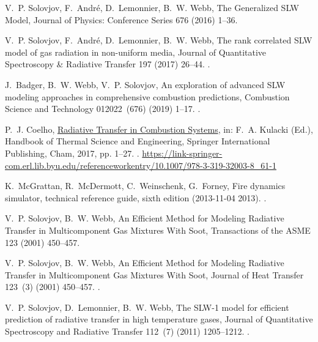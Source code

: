 \documentclass[preprint,12pt]{elsarticle}
\begin{document}
\begin{thebibliography}{10}
V.~P. Solovjov, F.~Andr{\'e}, D.~Lemonnier, B.~W. Webb, {The Generalized {SLW}
Model}, {Journal of Physics: Conference Series} 676 (2016) 1--36.

V.~P. Solovjov, F.~Andr{\'e}, D.~Lemonnier, B.~W. Webb, {The rank correlated
{SLW} model of gas radiation in non-uniform media}, {Journal of Quantitative
Spectroscopy {\&} Radiative Transfer} 197 (2017) 26--44.
\newblock \href {http://dx.doi.org/10.1016/j.jqsrt.2017.01.034}
  {}.

J.~Badger, B.~W. Webb, V.~P. Solovjov, {An exploration of advanced {SLW}
modeling approaches in comprehensive combustion predictions}, {Combustion
Science and Technology} 012022~(676) (2019) 1--17.
\newblock \href {http://dx.doi.org/10.1080/00102202.2019.1678907}
  {}.

P.~J. Coelho,
\href{https://link-springer-com.erl.lib.byu.edu/referenceworkentry/10.1007/978-3-319-32003-8_61-1}{{Radiative
Transfer in Combustion Systems}}, in: F.~A. Kulacki (Ed.), {Handbook of
Thermal Science and Engineering}, {Springer International Publishing}, Cham,
2017, pp. 1--27.
\newblock \href {http://dx.doi.org/10.1007/978-3-319-32003-8{\textunderscore
  }61-1} {}.
\newline\urlprefix\url{https://link-springer-com.erl.lib.byu.edu/referenceworkentry/10.1007/978-3-319-32003-8_61-1}

K.~McGrattan, R.~McDermott, C.~Weinschenk, G.~Forney, Fire dynamics simulator,
technical reference guide, sixth edition (2013-11-04 2013).
\newblock \href {http://dx.doi.org/https://doi.org/10.6028/NIST.sp.1018}
  {}.

V.~P. Solovjov, B.~W. Webb, {An Efficient Method for Modeling Radiative
Transfer in Multicomponent Gas Mixtures With Soot}, {Transactions of the
ASME} 123 (2001) 450--457.

V.~P. Solovjov, B.~W. Webb, {An Efficient Method for Modeling Radiative
Transfer in Multicomponent Gas Mixtures With Soot}, {Journal of Heat
Transfer} 123~(3) (2001) 450--457.
\newblock \href {http://dx.doi.org/10.1115/1.1350824}
  {}.

V.~P. Solovjov, D.~Lemonnier, B.~W. Webb, {The {SLW}-1 model for efficient
prediction of radiative transfer in high temperature gases}, {Journal of
Quantitative Spectroscopy and Radiative Transfer} 112~(7) (2011) 1205--1212.
\newblock \href {http://dx.doi.org/10.1016/j.jqsrt.2010.08.009}
  {}.


\end{thebibliography}
\end{document}
